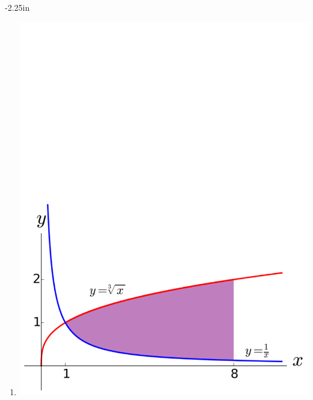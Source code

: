 \begin{adjustwidth*}{}{-2.25in}
\begin{multicols*}{2}
\begin{enumerate}[1),resume]
\item \noindent
\begin{minipage}{\linewidth}
\includegraphics[scale=.35]{figs/4/4-7_Exc.pdf}
\end{minipage}


\end{enumerate}
\end{multicols*}
\end{adjustwidth*}
